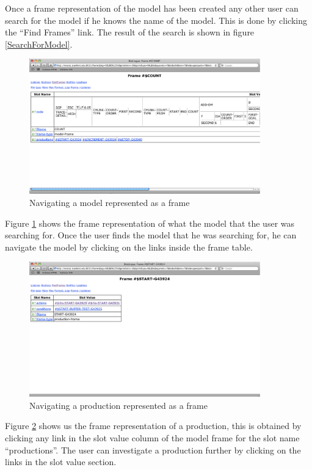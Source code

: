 Once a frame representation of the model has been created any other
user can search for the model if he knows the name of the model. This
is done by clicking the ``Find Frames'' link. The result of the search
is shown in figure \ref{SearchForModel}.

\begin{figure}[htp]
  \centering
  \includegraphics[width=100mm]{NavigateFrame}
  \caption{Navigating a model represented as a frame}
  \label{NavigateFrame}
\end{figure}

Figure \ref{NavigateFrame} shows the frame representation of what the
model that the user was searching for. Once the user finds the model
that he was searching for, he can navigate the model by clicking on
the links inside the frame table.

\begin{figure}[h]
  \centering
  \includegraphics[width=100mm]{NavigatingAProduction}
  \caption{Navigating a production represented as a frame}
  \label{NavigatingAProduction}
\end{figure}

Figure \ref{NavigatingAProduction} shows us the frame representation
of a production, this is obtained by clicking any link in the slot
value column of the model frame for the slot name ``productions''. The
user can investigate a production further by clicking on the links in
the slot value section. 


